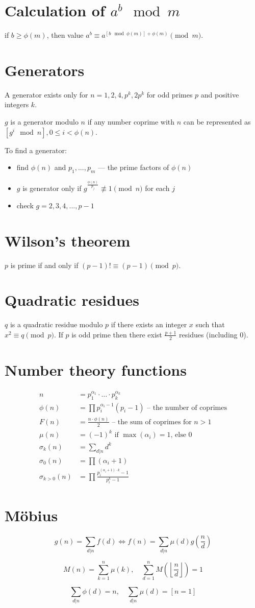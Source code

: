 \section*{Calculation of $a^b \mod m$}
if $b \ge \phi(m)$, then value $a^b \equiv a^{\left[b \mod \phi(m)\right] + \phi(m)} \pmod m$.

\section*{Generators}
A generator exists only for $n = 1, 2, 4, p^k, 2p^k$ for odd primes $p$ and positive integers $k$. 

$g$ is a generator modulo $n$ if any number coprime with $n$ can be represented as $\left[ g^i \mod n \right], 0 \le i < \phi(n)$.

To find a generator:
\begin{itemize}
\item find $\phi(n)$ and $p_1, ..., p_m$ --- the prime factors of $\phi(n)$
\item $g$ is generator only if $g^{\frac{\phi(n)}{p_j}} \not\equiv 1 \pmod n$ for each $j$
\item check $g = 2, 3, 4, ..., p - 1$
\end{itemize}

\section*{Wilson's theorem}
$p$ is prime if and only if $(p - 1)! \equiv (p - 1) \pmod p$.

\section*{Quadratic residues}
$q$ is a quadratic residue modulo $p$ if there exists an integer $x$ such that $x^2 \equiv q \pmod p$.
If $p$ is odd prime then there exist $\frac{p + 1}{2}$ residues (including 0).

\section*{Number theory functions}
\begin{align*}
n &= p_1^{\alpha_1} \cdot \dots \cdot p_k^{\alpha_k}\\
\phi(n) &= \prod p_i^{\alpha_i - 1} (p_i - 1) \text{ – the number of coprimes}\\
F(n) &= \frac{n \cdot \phi(n)}{2} \text{ – the sum of coprimes for } n > 1\\
\mu(n) &= (-1)^k \text{ if } \max(\alpha_i) = 1 \text {, else } 0\\
\sigma_k(n) &= \sum_{d|n} d^k\\
\sigma_0(n) &= \prod (\alpha_i + 1)\\
\sigma_{k > 0}(n) &= \prod \frac{p_i^{(\alpha_i + 1) \cdot k} - 1}{p_i^k - 1} 
\end{align*}

\section*{Möbius}
$$g(n) = \sum_{d|n}f(d) \iff f(n) = \sum_{d|n}\mu(d)g\left(\frac{n}{d}\right)$$

$$M(n) = \sum_{k=1}^{n}\mu(k), \quad \sum_{d = 1}^{n} M\left(\left\lfloor\frac{n}{d}\right\rfloor\right) = 1$$

$$\sum_{d|n} \phi(d) = n, \quad \sum_{d|n} \mu(d) = [n = 1]$$
